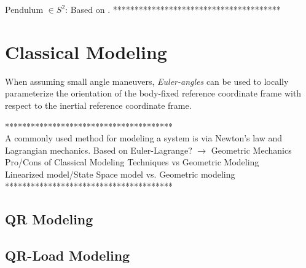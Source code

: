 Pendulum $ \in S^2 $: Based on \cite{Lee2011}.
***************************************\\

\section{Classical Modeling}
 When assuming small angle maneuvers, \textit{Euler-angles} can be used to locally parameterize the orientation of the body-fixed reference coordinate frame with respect to the inertial reference coordinate frame. 

***************************************\\
A commonly used method for modeling a system is via Newton's law and Lagrangian mechanics. 
Based on Euler-Lagrange? $ \rightarrow $ Geometric Mechanics\\

Pro/Cons of Classical Modeling Techniques vs Geometric Modeling\\

Linearized model/State Space model vs. Geometric modeling\\
***************************************\\
		\subsection{QR Modeling}
		\subsection{QR-Load Modeling}	
		
